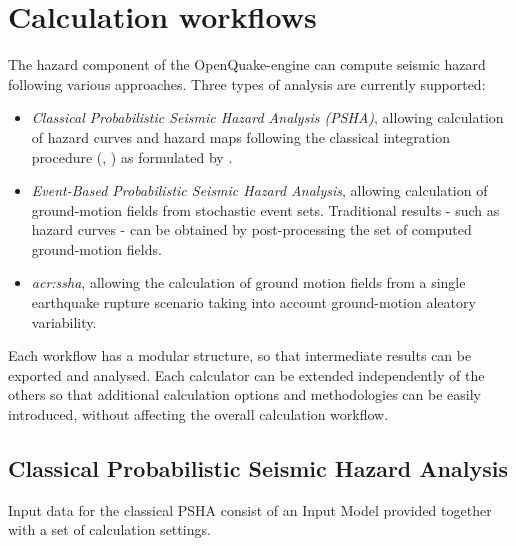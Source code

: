 \section{Calculation workflows}
The hazard component of the OpenQuake-engine can compute seismic hazard 
following various approaches. 
%
Three types of analysis are currently supported:
\begin{itemize}
\item \textit{Classical Probabilistic Seismic Hazard Analysis (PSHA)}, 
allowing calculation of hazard curves and hazard maps following the 
classical integration procedure 
(\cite{cornell1968}, \citet{mcguire1976}) as formulated by \cite{field2003}.
%
\item \textit{Event-Based Probabilistic Seismic Hazard Analysis}, 
    allowing calculation of ground-motion fields from 
    stochastic event sets. Traditional results - 
    such as hazard curves - can be obtained by post-processing the 
    set of computed ground-motion fields.
\item \textit{\gls{acr:ssha}}, allowing the calculation of 
    ground motion fields from a single earthquake rupture scenario 
    taking into account ground-motion aleatory variability.
\end{itemize}
%
Each workflow has a modular structure, so that intermediate results 
can be exported and analysed. 
Each calculator can be extended independently of the others so that 
additional calculation options and methodologies can be easily 
introduced, without affecting the overall calculation workflow. 
%
\subsection{Classical Probabilistic Seismic Hazard Analysis}
\label{section:classicalPSHA}
%
Input data for the classical PSHA consist of an Input Model  
provided together with a set of calculation settings. 

